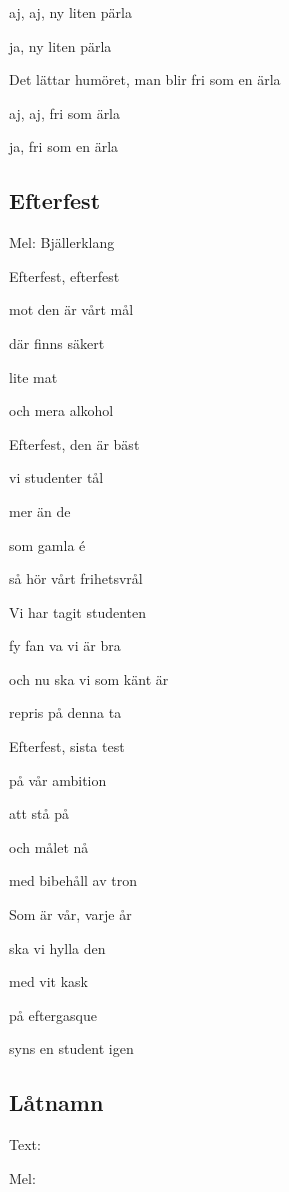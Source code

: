 aj, aj, ny liten pärla

ja, ny liten pärla\bigskip


Det lättar humöret, man blir fri som en ärla

aj, aj, fri som ärla

ja, fri som en ärla

\subsection{\textbf{Efterfest}}

Mel: Bjällerklang\bigskip


Efterfest, efterfest

mot den är vårt mål

där finns säkert

lite mat

och mera alkohol\bigskip


Efterfest, den är bäst

vi studenter tål

mer än de

som gamla é

så hör vårt frihetsvrål\bigskip


Vi har tagit studenten

fy fan va vi är bra

och nu ska vi som känt är

repris på denna ta\bigskip


Efterfest, sista test

på vår ambition

att stå på

och målet nå

med bibehåll av tron\bigskip


Som är vår, varje år

ska vi hylla den

med vit kask

på eftergasque

syns en student igen

\subsection{\textbf{Låtnamn}}

Text: 

Mel: \bigskip


\newpage